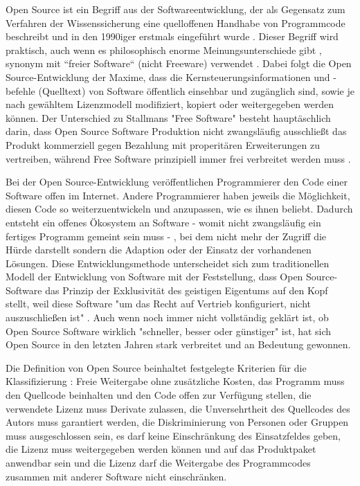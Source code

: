 Open Source ist ein Begriff aus der Softwareentwicklung, der als Gegensatz zum Verfahren der Wissenssicherung \cite{stallman2002} eine quelloffenen Handhabe von Programmcode beschreibt und in den 1990iger erstmals eingeführt wurde \cite[:5]{hippel_2003_open}. Dieser Begriff wird praktisch, auch wenn es philosophisch enorme Meinungsunterschiede gibt \cite[:5]{hippel_2003_open}  \cite[:169]{stallman2002}, synonym mit “freier Software“ (nicht Freeware) verwendet \cite{naeder_2010_open} \cite[:414]{mantz_2007_open}. Dabei folgt die Open Source-Entwicklung der Maxime, dass die Kernsteuerungsinformationen und -befehle (Quelltext) von Software öffentlich einsehbar und zugänglich sind, sowie je nach gewähltem Lizenzmodell modifiziert, kopiert oder weitergegeben werden können. Der Unterschied zu Stallmans "Free Software" besteht hauptäschlich darin, dass Open Source Software Produktion nicht zwangsläufig ausschließt das Produkt kommerziell gegen Bezahlung mit properitären Erweiterungen zu vertreiben, während Free Software prinzipiell immer frei verbreitet werden muss \cite{stallman2002}.

Bei der Open Source-Entwicklung veröffentlichen Programmierer den Code einer Software offen im Internet. Andere Programmierer haben jeweils die Möglichkeit, diesen Code so weiterzuentwickeln und anzupassen, wie es ihnen beliebt. Dadurch entsteht ein offenes Ökosystem an Software - womit nicht zwangsläufig ein fertiges Programm gemeint sein muss - , bei dem nicht mehr der Zugriff die Hürde darstellt sondern die Adaption oder der Einsatz der vorhandenen Lösungen. Diese Entwicklungsmethode unterscheidet sich zum traditionellen Modell der Entwicklung von Software mit der Feststellung, dass Open Source-Software das Prinzip der Exklusivität des geistigen Eigentums auf den Kopf stellt, weil diese Software "um das Recht auf Vertrieb konfiguriert, nicht auszuschließen ist" \cite{suchen}. Auch wenn noch immer nicht vollständig geklärt ist, ob Open Source Software wirklich "schneller, besser oder günstiger" ist, hat sich Open Source in den letzten Jahren stark verbreitet \cite{Lerner_2001} und an Bedeutung gewonnen.

Die Definition von Open Source beinhaltet festgelegte Kriterien für die Klassifizierung \cite{osd_2003}: Freie Weitergabe ohne zusätzliche Kosten, das Programm muss den Quellcode beinhalten und den Code offen zur Verfügung stellen, die verwendete Lizenz muss Derivate zulassen, die Unversehrtheit des Quellcodes des Autors muss garantiert werden, die Diskriminierung von Personen oder Gruppen muss ausgeschlossen sein, es darf keine Einschränkung des Einsatzfeldes geben, die Lizenz muss weitergegeben werden können und auf das Produktpaket anwendbar sein und die Lizenz darf die Weitergabe des Programmcodes zusammen mit anderer Software nicht einschränken.

